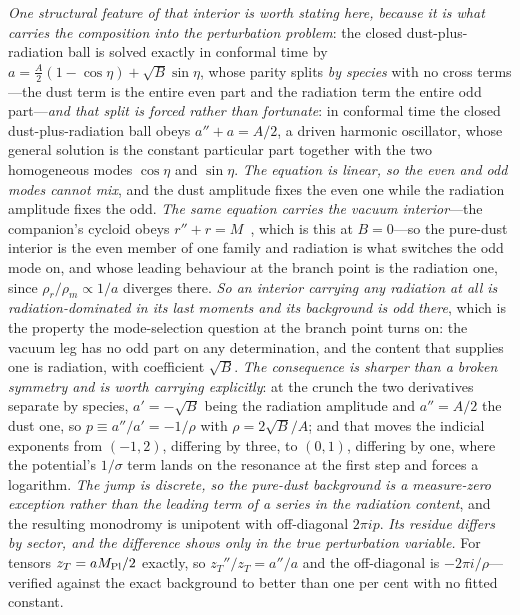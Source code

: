 \documentclass[11pt,a4paper]{article}
\theoremstyle{plain}
\theoremstyle{definition}
\theoremstyle{remark}
\begin{document}
\emph{One structural feature of that interior is worth stating here, because it is what carries the composition into the perturbation problem}: the closed dust-plus-radiation ball is solved exactly in conformal time by $a=\tfrac{A}{2}(1-\cos\eta)+\sqrt{B}\sin\eta$, whose parity splits \emph{by species} with no cross terms---the dust term is the entire even part and the radiation term the entire odd part---\emph{and that split is forced rather than fortunate}: in conformal time the closed dust-plus-radiation ball obeys $a''+a=A/2$, a driven harmonic oscillator, whose general solution is the constant particular part together with the two homogeneous modes $\cos\eta$ and $\sin\eta$. \emph{The equation is linear, so the even and odd modes cannot mix}, and the dust amplitude fixes the even one while the radiation amplitude fixes the odd. \emph{The same equation carries the vacuum interior}---the companion's cycloid obeys $r''+r=M$~\cite{JanzenCircle}, which is this at $B=0$---so the pure-dust interior is the even member of one family and radiation is what switches the odd mode on, and whose leading behaviour at the branch point is the radiation one, since $\rho_r/\rho_m\propto1/a$ diverges there. \emph{So an interior carrying any radiation at all is radiation-dominated in its last moments and its background is odd there}, which is the property the mode-selection question at the branch point turns on: the vacuum leg has no odd part on any determination, and the content that supplies one is radiation, with coefficient $\sqrt{B}$. \emph{The consequence is sharper than a broken symmetry and is worth carrying explicitly}: at the crunch the two derivatives separate by species, $a'=-\sqrt B$ being the radiation amplitude and $a''=A/2$ the dust one, so $p\equiv a''/a'=-1/\rho$ with $\rho=2\sqrt B/A$; and that moves the indicial exponents from $(-1,2)$, differing by three, to $(0,1)$, differing by one, where the potential's $1/\sigma$ term lands on the resonance at the first step and forces a logarithm. \emph{The jump is discrete, so the pure-dust background is a measure-zero exception rather than the leading term of a series in the radiation content}, and the resulting monodromy is unipotent with off-diagonal $2\pi ip$. \emph{Its residue differs by sector, and the difference shows only in the true perturbation variable.} For tensors $z_T=aM_{\rm Pl}/2$ exactly, so $z_T''/z_T=a''/a$ and the off-diagonal is $-2\pi i/\rho$---verified against the exact background to better than one per cent with no fitted constant. 
\end{document}
